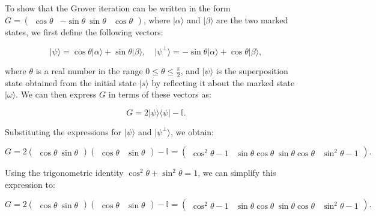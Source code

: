 To show that the Grover iteration can be written in the form $G = \begin{pmatrix} \cos\theta & -\sin\theta \ \sin\theta & \cos\theta \end{pmatrix}$, where $|\alpha\rangle$ and $|\beta\rangle$ are the two marked states, we first define the following vectors:

\begin{equation}
|\psi\rangle = \cos\theta|\alpha\rangle + \sin\theta|\beta\rangle, \quad |\psi^\perp\rangle = -\sin\theta|\alpha\rangle + \cos\theta|\beta\rangle,
\end{equation}



where $\theta$ is a real number in the range $0\leq\theta\leq\frac{\pi}{2}$, and $|\psi\rangle$ is the superposition state obtained from the initial state $|s\rangle$ by reflecting it about the marked state $|\omega\rangle$. We can then express $G$ in terms of these vectors as:

\begin{equation}
G = 2|\psi\rangle\langle\psi| - \mathbb{I}.
\end{equation}

Substituting the expressions for $|\psi\rangle$ and $|\psi^\perp\rangle$, we obtain:

\begin{equation}
G = 2\begin{pmatrix}\cos\theta \ \sin\theta\end{pmatrix} \begin{pmatrix}\cos\theta & \sin\theta\end{pmatrix} - \mathbb{I} = \begin{pmatrix} \cos^2\theta - 1 & \sin\theta\cos\theta \ \sin\theta\cos\theta & \sin^2\theta - 1 \end{pmatrix}.
\end{equation}

Using the trigonometric identity $\cos^2\theta + \sin^2\theta = 1$, we can simplify this expression to:

\begin{equation}
G = 2\begin{pmatrix}\cos\theta \ \sin\theta\end{pmatrix} \begin{pmatrix}\cos\theta & \sin\theta\end{pmatrix} - \mathbb{I} = \begin{pmatrix} \cos^2\theta - 1 & \sin\theta\cos\theta \ \sin\theta\cos\theta & \sin^2\theta - 1 \end{pmatrix}.
\end{equation}



